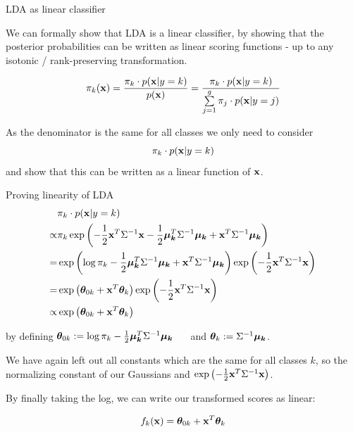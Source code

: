 \documentclass[11pt,compress,t,notes=noshow, xcolor=table]{beamer}
\begin{document}
\begin{vbframe}{LDA as linear classifier}

We can formally show that LDA is a linear classifier, by showing that the posterior probabilities
can be written as linear scoring functions - up to any isotonic / rank-preserving transformation.

$$
  \pikx = \frac{\pik \cdot \pdfxyk }{\pdfx} = \frac{\pik \cdot \pdfxyk}{\sumjg \pi_j \cdot \pdfxyk[j]}
$$

As the denominator is the same for all classes we only need to consider 
$$\pik \cdot \pdfxyk$$ 
and show that this can be written as a linear function of $\xv$.
  
\end{vbframe}

\begin{vbframe}{Proving linearity of LDA}
\begin{eqnarray*}
& \pik \cdot \pdfxyk \\
  \propto& \pik \exp\left(- \frac{1}{2} \xv^T\Sigma^{-1}\xv - \frac{1}{2} \muk^T \Sigma^{-1} \muk + \xv^T \Sigma^{-1} \muk \right) \\
=& \exp\left(\log \pik  - \frac{1}{2} \muk^T \Sigma^{-1} \muk + \xv^T \Sigma^{-1} \muk \right) \exp\left(- \frac{1}{2} \xv^T\Sigma^{-1}\xv\right) \\
=& \exp\left(\thetav_{0k} + \xv^T \thetav_k\right) \exp\left(- \frac{1}{2} \xv^T\Sigma^{-1}\xv\right)\\
\propto& \exp\left(\thetav_{0k} + \xv^T \thetav_k\right) 
\end{eqnarray*}

by defining
$\thetav_{0k} := \log \pik  - \frac{1}{2} \muk^T \Sigma^{-1} \muk$ $\quad$ and $\thetav_k := \Sigma^{-1} \muk$.

\lz

We have again left out all constants which are the same for all classes $k$, 
  so the normalizing constant of our Gaussians and 
  $\exp\left(- \frac{1}{2} \xv^T\Sigma^{-1}\xv\right)$.

\lz

By finally taking the log, we can write our transformed scores as linear:  

$$ \fkx =  \thetav_{0k} + \xv^T \thetav_k $$

\end{vbframe}
\end{document}

